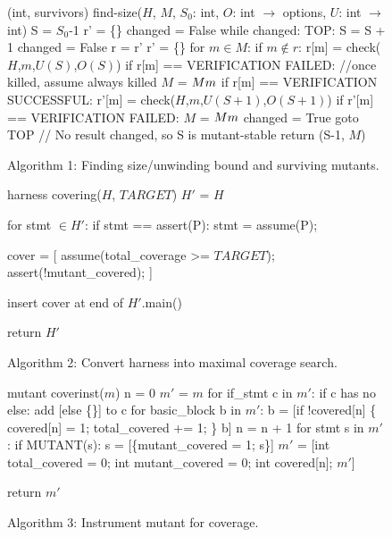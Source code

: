 \documentclass[conference]{IEEEtran}
\begin{document}
\begin{figure}
{\scriptsize 
\begin{code}
(int, survivors) find-size($H$, $M$, $S_0$: int,
                           $O$: int $\rightarrow$ options,
                           $U$: int $\rightarrow$ int) 
\vspace{0.1in}
S = $S_0$-1 
r' = \{\}
changed = False 
while changed:
   TOP:
   S = S + 1 
   changed = False 
   r = r' 
   r' = \{\}
   for $m \in M$:
      if $m \not\in r$:
         r[m] = check($H$,$m$,$U(S)$,$O(S)$) 
         if r[m] == VERIFICATION FAILED:
            //once killed, assume always killed 
            $M$ = $M \\ m$
      if r[m] == VERIFICATION SUCCESSFUL:
         r'[m] = check($H$,$m$,$U(S+1)$,$O(S+1)$) 
         if r'[m] == VERIFICATION FAILED:
            $M$ = $M \\ m$
            changed = True 
            goto TOP 
// No result changed, so S is mutant-stable 
return (S-1, $M$) 
\end{code}
}
\caption{Algorithm 1: Finding size/unwinding bound and surviving mutants.}
\label{alg:unwind}
\end{figure}

\begin{figure}
{\scriptsize 
\begin{code}
harness covering($H$, $TARGET$) 
\vspace{0.1in}
$H'$ = $H$

for stmt $\in H'$:
   if stmt == assert(P):
      stmt = assume(P);

cover = [
  assume(total\_coverage >= $TARGET$); 
  assert(!mutant\_covered);
]

insert cover at end of $H'$.main() 

return $H'$
\end{code}
}
\caption{Algorithm 2: Convert harness into maximal coverage search.}
\label{alg:invert}
\end{figure}

\begin{figure}
{\scriptsize 
\begin{code}
mutant coverinst($m$) 
\vspace{0.1in}
n = 0
$m'$ = $m$
for if\_stmt c in $m'$:
   if c has no else:
      add [else \{\}] to c
for basic\_block b in $m'$:
   b = [if !covered[n] \{
           covered[n] = 1;
           total\_covered += 1;
        \}
        b]
   n = n + 1
for stmt s in $m'$:
   if MUTANT(s):
      s = [\{mutant\_covered = 1;
            s\}]
$m'$ = [int total\_covered = 0;
      int mutant\_covered = 0;
      int covered[n];
      $m'$]

return $m'$
\end{code}
}
\caption{Algorithm 3: Instrument mutant for coverage.}
\label{alg:covermut}
\end{figure}
\end{document}
